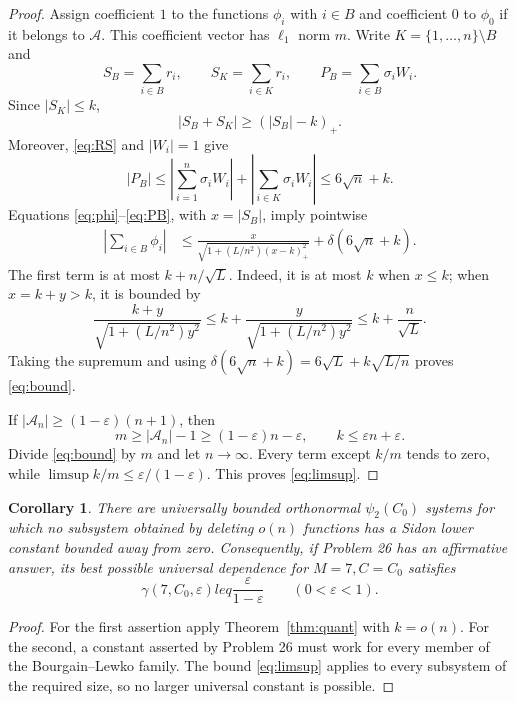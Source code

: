 \documentclass[11pt]{article}
\newtheorem{corollary}[theorem]{Corollary}
\begin{document}
\begin{proof}
Assign coefficient $1$ to the functions $\phi_i$ with $i\in B$ and
coefficient $0$ to $\phi_0$ if it belongs to $\mathcal A$.  This coefficient
vector has $\ell_1$ norm $m$.  Write $K=\{1,\ldots,n\}\setminus B$ and
\[
 S_B=\sum_{i\in B}r_i,\qquad S_K=\sum_{i\in K}r_i,
 \qquad P_B=\sum_{i\in B}\sigma_iW_i.
\]
Since $|S_K|\leq k$,
\begin{equation}\label{eq:total}
 |S_B+S_K|\geq (|S_B|-k)_+.
\end{equation}
Moreover, \eqref{eq:RS} and $|W_i|=1$ give
\begin{equation}\label{eq:PB}
 |P_B|
 \leq\left|\sum_{i=1}^n\sigma_iW_i\right|
      +\left|\sum_{i\in K}\sigma_iW_i\right|
 \leq6\sqrt n+k.
\end{equation}
Equations \eqref{eq:phi}--\eqref{eq:PB}, with $x=|S_B|$, imply pointwise
\begin{align*}
 \left|\sum_{i\in B}\phi_i\right|
 &\leq
 \frac{x}{\sqrt{1+(L/n^2)(x-k)_+^2}}
 +\delta(6\sqrt n+k).
\end{align*}
The first term is at most $k+n/\sqrt L$.  Indeed, it is at most $k$ when
$x\leq k$; when $x=k+y>k$, it is bounded by
\[
 \frac{k+y}{\sqrt{1+(L/n^2)y^2}}
 \leq k+\frac{y}{\sqrt{1+(L/n^2)y^2}}
 \leq k+\frac n{\sqrt L}.
\]
Taking the supremum and using
$\delta(6\sqrt n+k)=6\sqrt L+k\sqrt{L/n}$ proves \eqref{eq:bound}.

If $|\mathcal A_n|\geq(1-\varepsilon)(n+1)$, then
\[
 m\geq |\mathcal A_n|-1
 \geq(1-\varepsilon)n-\varepsilon,
 \qquad
 k\leq\varepsilon n+\varepsilon.
\]
Divide \eqref{eq:bound} by $m$ and let $n\to\infty$.  Every term except
$k/m$ tends to zero, while
$\limsup k/m\leq\varepsilon/(1-\varepsilon)$.  This proves
\eqref{eq:limsup}.
\end{proof}

\begin{corollary}
There are universally bounded orthonormal $\psi_2(C_0)$ systems for which no
subsystem obtained by deleting $o(n)$ functions has a Sidon lower constant
bounded away from zero.  Consequently, if Problem 26 has an affirmative
answer, its best possible universal dependence for $M=7,C=C_0$ satisfies
\[
 \gamma(7,C_0,\varepsilon)leq
 \frac{\varepsilon}{1-\varepsilon}
 \qquad(0<\varepsilon<1).
\]
\end{corollary}

\begin{proof}
For the first assertion apply Theorem~\ref{thm:quant} with $k=o(n)$.
For the second, a constant asserted by Problem 26 must work for every member
of the Bourgain--Lewko family.  The bound \eqref{eq:limsup} applies to every
subsystem of the required size, so no larger universal constant is possible.
\end{proof}
\end{document}
